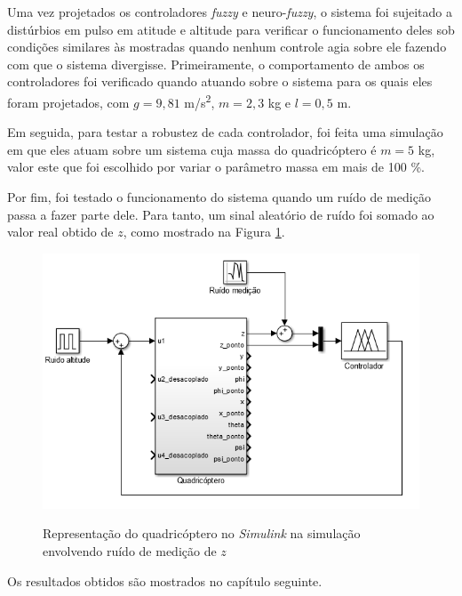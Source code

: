 Uma vez projetados os controladores \textit{fuzzy} e neuro-\textit{fuzzy}, o sistema foi sujeitado a distúrbios em pulso em atitude e altitude para verificar o funcionamento deles sob condições similares às mostradas quando nenhum controle agia sobre ele fazendo com que o sistema divergisse. Primeiramente, o comportamento de ambos os controladores foi verificado quando atuando sobre o sistema para os quais eles foram projetados, com $g=9,81$ m/s\textsuperscript{2}, $m=2,3$ kg e $l=0,5$ m. 

Em seguida, para testar a robustez de cada controlador, foi feita uma simulação em que eles atuam sobre um sistema cuja massa do quadricóptero é $m=5$ kg, valor este que foi escolhido por variar o parâmetro massa em mais de 100 \%.

Por fim, foi testado o funcionamento do sistema quando um ruído de medição passa a fazer parte dele. Para tanto, um sinal aleatório de ruído foi somado ao valor real obtido de $z$, como mostrado na Figura \ref{fig:diagrama_sistema_com_ruido}.

\begin{figure}[!htb]
    \centering
    \caption{Representação do quadricóptero no \textit{Simulink} na simulação envolvendo ruído de medição de $z$}
    \includegraphics[width=1\textwidth]{./04-figuras/figuras_pos_banca/7-altitude2kg_ruido/diagrama_sistema_com_ruido}
    \label{fig:diagrama_sistema_com_ruido}
\end{figure}

Os resultados obtidos são mostrados no capítulo seguinte.